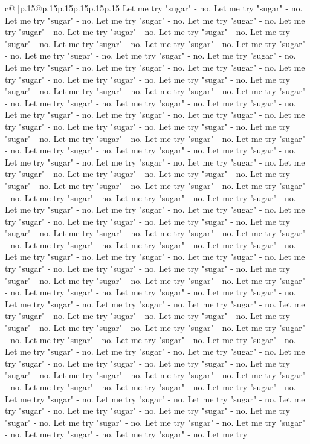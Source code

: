 \documentclass{article}
\begin{document}
{\begin{supertabular}{c@{$\;$}|p{.15\linewidth}@{}p{.15\linewidth}p{.15\linewidth}p{.15\linewidth}p{.15\linewidth}p{.15\linewidth}}
{{{Let me try "sugar" {-} no. Let me try "sugar" {-} no. Let me try "sugar" {-} no. Let me try "sugar" {-} no. Let me try "sugar" {-} no. Let me try "sugar" {-} no. Let me try "sugar" {-} no. Let me try "sugar" {-} no. Let me try "sugar" {-} no. Let me try "sugar" {-} no. Let me try "sugar" {-} no. Let me try "sugar" {-} no. Let me try "sugar" {-} no. Let me try "sugar" {-} no. Let me try "sugar" {-} no. Let me try "sugar" {-} no. Let me try "sugar" {-} no. Let me try "sugar" {-} no. Let me try "sugar" {-} no. Let me try "sugar" {-} no. Let me try "sugar" {-} no. Let me try "sugar" {-} no. Let me try "sugar" {-} no. Let me try "sugar" {-} no. Let me try "sugar" {-} no. Let me try "sugar" {-} no. Let me try "sugar" {-} no. Let me try "sugar" {-} no. Let me try "sugar" {-} no. Let me try "sugar" {-} no. Let me try "sugar" {-} no. Let me try "sugar" {-} no. Let me try "sugar" {-} no. Let me try "sugar" {-} no. Let me try "sugar" {-} no. Let me try "sugar" {-} no. Let me try "sugar" {-} no. Let me try "sugar" {-} no. Let me try "sugar" {-} no. Let me try "sugar" {-} no. Let me try "sugar" {-} no. Let me try "sugar" {-} no. Let me try "sugar" {-} no. Let me try "sugar" {-} no. Let me try "sugar" {-} no. Let me try "sugar" {-} no. Let me try "sugar" {-} no. Let me try "sugar" {-} no. Let me try "sugar" {-} no. Let me try "sugar" {-} no. Let me try "sugar" {-} no. Let me try "sugar" {-} no. Let me try "sugar" {-} no. Let me try "sugar" {-} no. Let me try "sugar" {-} no. Let me try "sugar" {-} no. Let me try "sugar" {-} no. Let me try "sugar" {-} no. Let me try "sugar" {-} no. Let me try "sugar" {-} no. Let me try "sugar" {-} no. Let me try "sugar" {-} no. Let me try "sugar" {-} no. Let me try "sugar" {-} no. Let me try "sugar" {-} no. Let me try "sugar" {-} no. Let me try "sugar" {-} no. Let me try "sugar" {-} no. Let me try "sugar" {-} no. Let me try "sugar" {-} no. Let me try "sugar" {-} no. Let me try "sugar" {-} no. Let me try "sugar" {-} no. Let me try "sugar" {-} no. Let me try "sugar" {-} no. Let me try "sugar" {-} no. Let me try "sugar" {-} no. Let me try "sugar" {-} no. Let me try "sugar" {-} no. Let me try "sugar" {-} no. Let me try "sugar" {-} no. Let me try "sugar" {-} no. Let me try "sugar" {-} no. Let me try "sugar" {-} no. Let me try "sugar" {-} no. Let me try "sugar" {-} no. Let me try "sugar" {-} no. Let me try "sugar" {-} no. Let me try "sugar" {-} no. Let me try "sugar" {-} no. Let me try "sugar" {-} no. Let me try "sugar" {-} no. Let me try "sugar" {-} no. Let me try "sugar" {-} no. Let me try "sugar" {-} no. Let me try "sugar" {-} no. Let me try "sugar" {-} no. Let me try "sugar" {-} no. Let me try "sugar" {-} no. Let me try "sugar" {-} no. Let me try "sugar" {-} no. Let me try "sugar" {-} no. Let me try "sugar" {-} no. Let me try "sugar" {-} no. Let me try "sugar" {-} no. Let me try "sugar" {-} no. Let me try "sugar" {-} no. Let me try "sugar" {-} no. Let me try "sugar" {-} no. Let me try "sugar" {-} no. Let me try "sugar" {-} no. Let me try "sugar" {-} no. Let me try "sugar" {-} no. Let me try "sugar" {-} no. Let me try "sugar" {-} no. Let me try "sugar" {-} no. Let me try "sugar" {-} no. Let me try "sugar" {-} no. Let me try }}}
\end{supertabular}}
\end{document}

